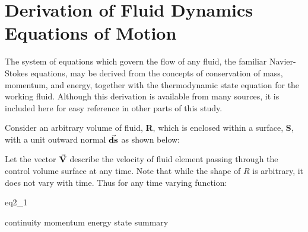 \section{Derivation of Fluid Dynamics Equations of Motion}

The  system of equations which govern the flow of any fluid, the familiar
Navier-Stokes equations, may be derived from the concepts of conservation of
mass, momentum, and energy, together with the thermodynamic state equation for
the working fluid. Although this derivation is available from many sources, it
is included here for easy reference in other parts of this study.

Consider an arbitrary volume of fluid, {\bf R}, which is enclosed within a
surface, {\bf S}, with a unit outward normal {$\va{ds}$} as shown
below:


Let the vector {$\va{V}$} describe the velocity of fluid element
passing through the control volume surface at any time. Note that while the
shape of $R$ is arbitrary, it does not vary with time. Thus for any time
varying function:

{eq2_1}

{continuity}
{momentum}
{energy}
{state}
{summary}


